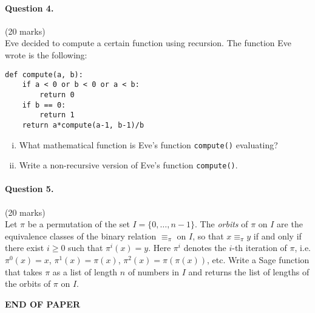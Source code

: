 \documentclass[12pt]{article}
\begin{document}
\paragraph{Question 4.}\hfill (20 marks)\\
Eve decided to compute a certain function using recursion. The function Eve
wrote is the following: 
\begin{verbatim}
def compute(a, b):
    if a < 0 or b < 0 or a < b:
        return 0
    if b == 0:
        return 1
    return a*compute(a-1, b-1)/b
\end{verbatim}
\begin{enumerate}[(i)]
    \item What mathematical function is Eve's function \verb|compute()|
    evaluating?
    \item Write a non-recursive version of Eve's function \verb|compute()|.
\end{enumerate}
\bigskip
\bigskip
\bigskip
\bigskip

\paragraph{Question 5.}\hfill (20 marks)\\
Let $\pi$ be a permutation of the set $I=\{0,\dots,n-1\}$.  The {\em orbits} of
$\pi$ on $I$ are the  equivalence classes of the binary relation $\equiv_{\pi}$ on
$I$, so that $x\equiv_{\pi} y$ if and only if there exist $i\geq 0$ such that
$\pi^i(x)=y$. Here $\pi^i$ denotes the $i$-th iteration of $\pi$, i.e.
$\pi^0(x)=x$, 
$\pi^1(x)=\pi(x)$, $\pi^2(x)=\pi(\pi(x))$, etc.  Write a Sage function that
takes $\pi$ as a list of length $n$ of numbers in $I$ and returns the list of
lengths of the orbits of $\pi$ on $I$.

\vfill
\begin{center}{\bf END OF PAPER}\end{center}
\end{document}
